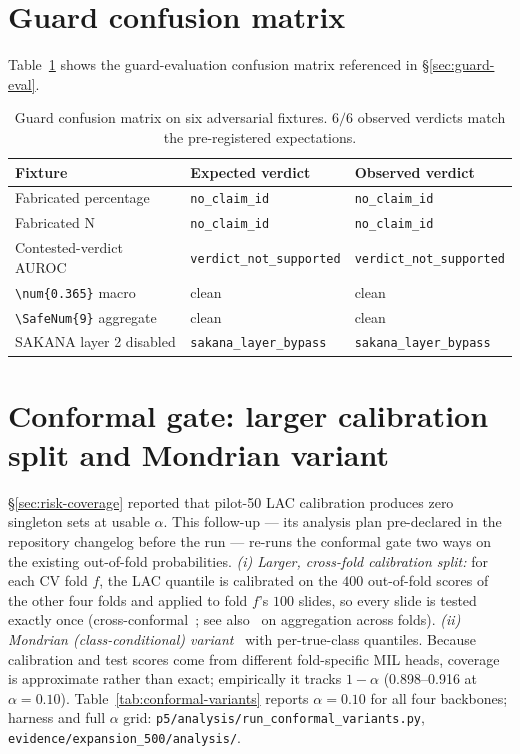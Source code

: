 \documentclass{article}
\newcommand{\SafeNum}[1]{#1}
\begin{document}
\section{Guard confusion matrix}
\label{app:guard-table}

Table~\ref{tab:guard-eval} shows the guard-evaluation confusion matrix referenced in \S\ref{sec:guard-eval}.

\begin{table}[h]
\centering
\caption{Guard confusion matrix on six adversarial fixtures. $\SafeNum{6}/\SafeNum{6}$ observed verdicts match the pre-registered expectations.}
\label{tab:guard-eval}
\begin{tabular}{@{}lll@{}}
\toprule
Fixture & Expected verdict & Observed verdict \\
\midrule
Fabricated percentage      & \texttt{no\_claim\_id}          & \texttt{no\_claim\_id} \\
Fabricated N               & \texttt{no\_claim\_id}          & \texttt{no\_claim\_id} \\
Contested-verdict AUROC    & \texttt{verdict\_not\_supported}& \texttt{verdict\_not\_supported} \\
\texttt{\textbackslash num\{0.365\}} macro     & clean                           & clean \\
\texttt{\textbackslash SafeNum\{9\}} aggregate & clean                           & clean \\
SAKANA layer 2 disabled    & \texttt{sakana\_layer\_bypass}  & \texttt{sakana\_layer\_bypass} \\
\bottomrule
\end{tabular}
\end{table}

\section{Conformal gate: larger calibration split and Mondrian variant}
\label{app:conformal-variants}

\S\ref{sec:risk-coverage} reported that pilot-50 LAC calibration produces zero singleton sets at usable $\alpha$. This follow-up --- its analysis plan pre-declared in the repository changelog before the run --- re-runs the conformal gate two ways on the existing out-of-fold probabilities. \emph{(i) Larger, cross-fold calibration split:} for each CV fold $f$, the LAC quantile is calibrated on the $\SafeNum{400}$ out-of-fold scores of the other four folds and applied to fold $f$'s $\SafeNum{100}$ slides, so every slide is tested exactly once (cross-conformal~\citep{vovk2015cross}; see also~\citep{barber2021jackknife} on aggregation across folds). \emph{(ii) Mondrian (class-conditional) variant}~\citep{sadinle2019least,romano2020classification} with per-true-class quantiles. Because calibration and test scores come from different fold-specific MIL heads, coverage is approximate rather than exact; empirically it tracks $1-\alpha$ (\SafeNum{0.898}--\SafeNum{0.916} at $\alpha{=}\SafeNum{0.10}$). Table~\ref{tab:conformal-variants} reports $\alpha{=}\SafeNum{0.10}$ for all four backbones; harness and full $\alpha$ grid: \texttt{p5/analysis/run\_conformal\_variants.py}, \texttt{evidence/expansion\_500/analysis/}.
\end{document}
